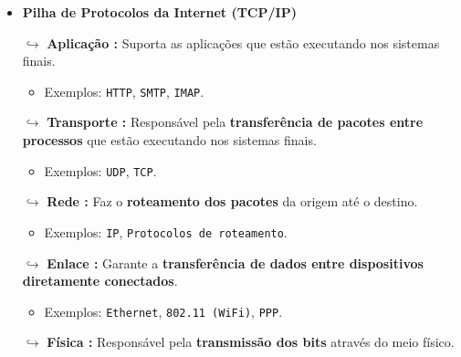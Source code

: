 \begin{itemize}
        \item \textbf{Pilha de Protocolos da Internet (TCP/IP)}
        
            $\hookrightarrow$ \textbf{Aplicação :} Suporta as aplicações que estão executando nos sistemas finais.
            \begin{itemize}
                \item Exemplos: \texttt{HTTP}, \texttt{SMTP}, \texttt{IMAP}.
            \end{itemize}
            
            $\hookrightarrow$ \textbf{Transporte :} Responsável pela \textbf{transferência de pacotes entre processos} que estão executando nos sistemas finais.
            \begin{itemize}
                \item Exemplos: \texttt{UDP}, \texttt{TCP}.
            \end{itemize}

            $\hookrightarrow$ \textbf{Rede :} Faz o \textbf{roteamento dos pacotes} da origem até o destino.
            \begin{itemize}
                \item Exemplos: \texttt{IP}, \texttt{Protocolos de roteamento}.
            \end{itemize}

            $\hookrightarrow$ \textbf{Enlace :} Garante a \textbf{transferência de dados entre dispositivos diretamente conectados}.
            \begin{itemize}
                \item Exemplos: \texttt{Ethernet}, \texttt{802.11 (WiFi)}, \texttt{PPP}.
            \end{itemize}

            $\hookrightarrow$ \textbf{Física :} Responsável pela \textbf{transmissão dos bits} através do meio físico.
        

        \begin{center}
        \end{center}


\end{itemize}
